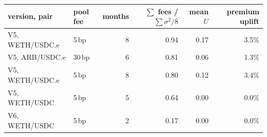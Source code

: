 \begin{tabular}{llrrrr}
\toprule
version, pair & pool fee & months & $\sum$ fees / $\sum \sigma^2/8$ & mean $U$ & premium uplift \\
\midrule
V5, WETH/USDC.e & 5\,bp & 8 & 0.94 & 0.17 & 3.5\% \\
V5, ARB/USDC.e & 30\,bp & 6 & 0.81 & 0.06 & 1.3\% \\
V5, WETH/USDC.e & 5\,bp & 8 & 0.80 & 0.12 & 3.4\% \\
V5, WETH/USDC & 5\,bp & 5 & 0.64 & 0.00 & 0.0\% \\
V6, WETH/USDC & 5\,bp & 2 & 0.17 & 0.00 & 0.0\% \\
\bottomrule
\end{tabular}
